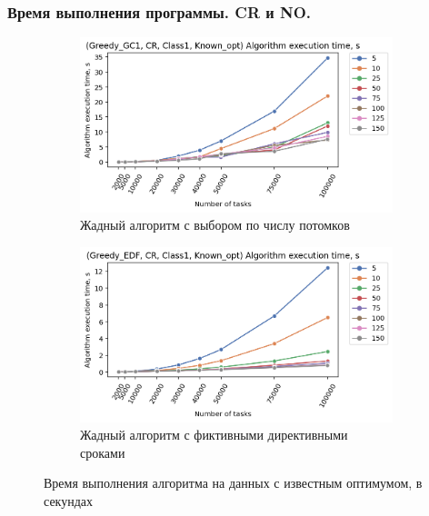 \begin{frame}
    \frametitle{Время выполнения программы. CR и NO.}
    \begin{figure}
        \begin{subfigure}{0.49\textwidth}
            \includegraphics[width=\textwidth]{imgs/ideal_1/CR/tr_graph.png}
            \caption{Жадный алгоритм с выбором по числу потомков}
        \end{subfigure}
        \begin{subfigure}{0.49\textwidth}
            \includegraphics[width=\textwidth]{imgs/ideal_1/CR_EDF/tr_graph.png}
            \caption{Жадный алгоритм с фиктивными директивными сроками}
        \end{subfigure}
        \caption{Время выполнения алгоритма на данных с известным оптимумом, в секундах}
    \end{figure}
\end{frame}
